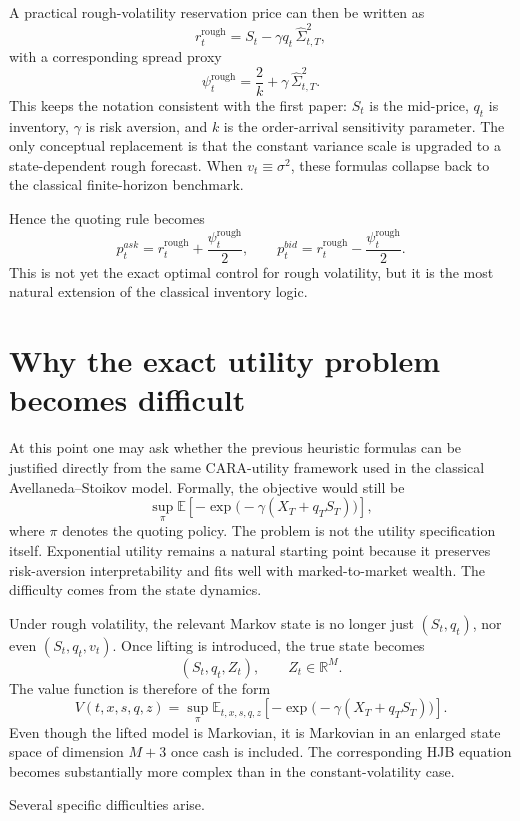 \documentclass[a4paper,10pt,titlepage,oneside,openany]{book}
\theoremstyle{plain}
\theoremstyle{definition}
\theoremstyle{remark}
\newcommand{\1}{\mathbf{1}}
\begin{document}
A practical rough-volatility reservation price can then be written as
\[
r_t^{\mathrm{rough}}
=
S_t-\gamma q_t\,\widehat{\Sigma}_{t,T}^2,
\]
with a corresponding spread proxy
\[
\psi_t^{\mathrm{rough}}
=
\frac{2}{k}
+
\gamma\,\widehat{\Sigma}_{t,T}^2.
\]
This keeps the notation consistent with the first paper: \(S_t\) is the mid-price, \(q_t\) is inventory, \(\gamma\) is risk aversion, and \(k\) is the order-arrival sensitivity parameter. The only conceptual replacement is that the constant variance scale is upgraded to a state-dependent rough forecast. When \(v_t\equiv \sigma^2\), these formulas collapse back to the classical finite-horizon benchmark.

Hence the quoting rule becomes
\[
p_t^{ask}=r_t^{\mathrm{rough}}+\frac{\psi_t^{\mathrm{rough}}}{2},
\qquad
p_t^{bid}=r_t^{\mathrm{rough}}-\frac{\psi_t^{\mathrm{rough}}}{2}.
\]
This is not yet the exact optimal control for rough volatility, but it is the most natural extension of the classical inventory logic.

\section{Why the exact utility problem becomes difficult}

At this point one may ask whether the previous heuristic formulas can be justified directly from the same CARA-utility framework used in the classical Avellaneda--Stoikov model. Formally, the objective would still be
\[
\sup_{\pi}
\mathbb{E}\!\left[
-\exp\!\bigl(-\gamma(X_T+q_TS_T)\bigr)
\right],
\]
where \(\pi\) denotes the quoting policy. The problem is not the utility specification itself. Exponential utility remains a natural starting point because it preserves risk-aversion interpretability and fits well with marked-to-market wealth. The difficulty comes from the state dynamics.

Under rough volatility, the relevant Markov state is no longer just \((S_t,q_t)\), nor even \((S_t,q_t,v_t)\). Once lifting is introduced, the true state becomes
\[
(S_t,q_t,Z_t),
\qquad
Z_t\in\mathbb{R}^M.
\]
The value function is therefore of the form
\[
V(t,x,s,q,z)
=
\sup_{\pi}
\mathbb{E}_{t,x,s,q,z}
\!\left[
-\exp\!\bigl(-\gamma(X_T+q_TS_T)\bigr)
\right].
\]
Even though the lifted model is Markovian, it is Markovian in an enlarged state space of dimension \(M+3\) once cash is included. The corresponding HJB equation becomes substantially more complex than in the constant-volatility case.

Several specific difficulties arise.
\end{document}
